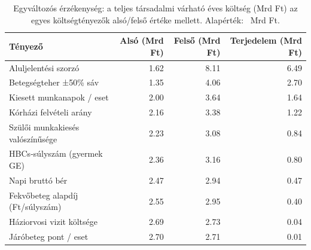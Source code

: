 \begin{table}[htbp]
\centering
\small
\caption{Egyváltozós érzékenység: a teljes társadalmi várható éves költség (Mrd Ft) az egyes költségtényezők alsó/felső értéke mellett. Alapérték: \baseCostMrd~Mrd Ft.}
\label{tab:tornado}
\begin{tabular}{p{5.4cm}rrr}
\toprule
Tényező & Alsó (Mrd Ft) & Felső (Mrd Ft) & Terjedelem (Mrd Ft) \\
\midrule
Aluljelentési szorzó & 1.62 & 8.11 & 6.49 \\
Betegségteher ±50\% sáv & 1.35 & 4.06 & 2.70 \\
Kiesett munkanapok / eset & 2.00 & 3.64 & 1.64 \\
Kórházi felvételi arány & 2.16 & 3.38 & 1.22 \\
Szülői munkakiesés valószínűsége & 2.23 & 3.08 & 0.84 \\
HBCs‑súlyszám (gyermek GE) & 2.36 & 3.16 & 0.80 \\
Napi bruttó bér & 2.47 & 2.94 & 0.47 \\
Fekvőbeteg alapdíj (Ft/súlyszám) & 2.55 & 2.95 & 0.40 \\
Háziorvosi vizit költsége & 2.69 & 2.73 & 0.04 \\
Járóbeteg pont / eset & 2.70 & 2.71 & 0.01 \\
\bottomrule
\end{tabular}
\end{table}
